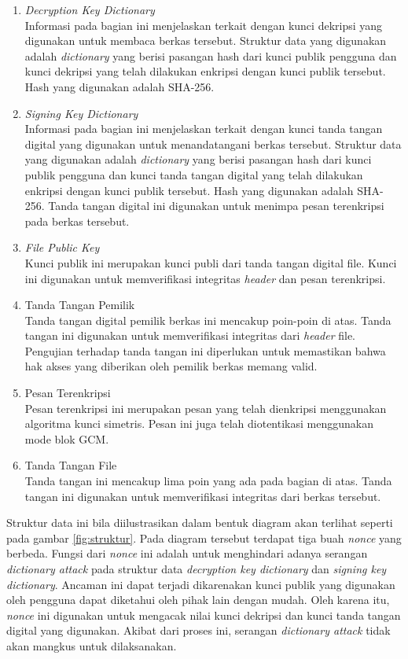 \documentclass[conference]{IEEEtran}
\begin{document}
\begin{enumerate}
    \item \emph{Decryption Key Dictionary} \\
    Informasi pada bagian ini menjelaskan terkait dengan kunci dekripsi yang digunakan untuk membaca berkas tersebut. Struktur data yang digunakan adalah \emph{dictionary} yang berisi pasangan hash dari kunci publik pengguna dan kunci dekripsi yang telah dilakukan enkripsi dengan kunci publik tersebut. Hash yang digunakan adalah SHA-256.
    \item \emph{Signing Key Dictionary} \\
    Informasi pada bagian ini menjelaskan terkait dengan kunci tanda tangan digital yang digunakan untuk menandatangani berkas tersebut. Struktur data yang digunakan adalah \emph{dictionary} yang berisi pasangan hash dari kunci publik pengguna dan kunci tanda tangan digital yang telah dilakukan enkripsi dengan kunci publik tersebut. Hash yang digunakan adalah SHA-256. Tanda tangan digital ini digunakan untuk menimpa pesan terenkripsi pada berkas tersebut. 
    \item \emph{File Public Key}\\
    Kunci publik ini merupakan kunci publi dari tanda tangan digital file. Kunci ini digunakan untuk memverifikasi integritas \emph{header} dan pesan terenkripsi.
    \item Tanda Tangan Pemilik\\
    Tanda tangan digital pemilik berkas ini mencakup poin-poin di atas. Tanda tangan ini digunakan untuk memverifikasi integritas dari \emph{header} file. Pengujian terhadap tanda tangan ini diperlukan untuk memastikan bahwa hak akses yang diberikan oleh pemilik berkas memang valid.
    \item Pesan Terenkripsi\\
    Pesan terenkripsi ini merupakan pesan yang telah dienkripsi menggunakan algoritma kunci simetris. Pesan ini juga telah diotentikasi menggunakan mode blok GCM.
    \item Tanda Tangan File\\
    Tanda tangan ini mencakup lima poin yang ada pada bagian di atas. Tanda tangan ini digunakan untuk memverifikasi integritas dari berkas tersebut.
\end{enumerate}

Struktur data ini bila diilustrasikan dalam bentuk diagram akan terlihat seperti pada gambar \ref{fig:struktur}. Pada diagram tersebut terdapat tiga buah \emph{nonce} yang berbeda. Fungsi dari \emph{nonce} ini adalah untuk menghindari adanya serangan \emph{dictionary attack} pada struktur data \emph{decryption key dictionary} dan \emph{signing key dictionary}. Ancaman ini dapat terjadi dikarenakan kunci publik yang digunakan oleh pengguna dapat diketahui oleh pihak lain dengan mudah. Oleh karena itu, \emph{nonce} ini digunakan untuk mengacak nilai kunci dekripsi dan kunci tanda tangan digital yang digunakan. Akibat dari proses ini, serangan \emph{dictionary attack} tidak akan mangkus untuk dilaksanakan.
\end{document}
